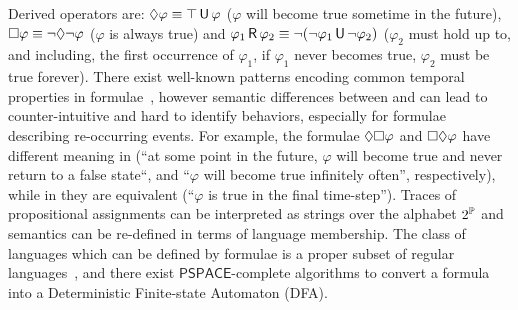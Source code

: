 Derived operators are: $\Diamond \varphi \equiv \top \,\mathsf{U}\, \varphi$ ($\varphi$ will become true sometime in the future), $\Box\varphi \equiv \neg \Diamond \neg \varphi$ ($\varphi$ is always true) and $\varphi_1 \,\mathsf{R}\, \varphi_2 \equiv \neg (\neg \varphi_1 \,\mathsf{U}\, \neg \varphi_2)$ ($\varphi_2$ must hold up to, and including, the first occurrence of $\varphi_1$, if $\varphi_1$ never becomes true, $\varphi_2$ must be true forever).
There exist well-known patterns encoding common temporal properties in \LTL formulae~\cite{dwyer1998property}, however semantic differences between \LTL and \LTLf can lead to counter-intuitive and hard to identify behaviors, especially for formulae describing re-occurring events.
For example, the formulae $\Diamond\Box \varphi$ and $\Box\Diamond \varphi$ have different meaning in \LTL (``at some point in the future, $\varphi$ will become true and never return to a false state``, and ``$\varphi$ will become true infinitely often'', respectively), while in \LTLf they are equivalent (``$\varphi$ is true in the final time-step'').
%
Traces of propositional assignments can be interpreted as strings over the alphabet $2^{\mathbb{P}}$ and \LTLf semantics can be re-defined in terms of language membership. The class of languages which can be defined by \LTLf formulae is a proper subset of regular languages~\cite{de2013linear}, and there exist $\mathsf{PSPACE}$-complete algorithms to convert a formula into a Deterministic Finite-state Automaton (DFA). %
